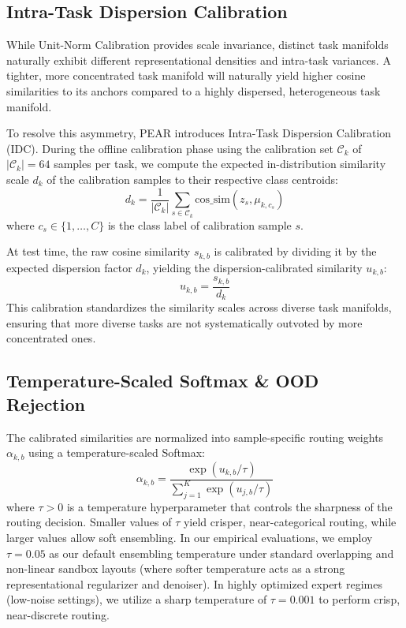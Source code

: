 \subsection{Intra-Task Dispersion Calibration}
While Unit-Norm Calibration provides scale invariance, distinct task manifolds naturally exhibit different representational densities and intra-task variances. A tighter, more concentrated task manifold will naturally yield higher cosine similarities to its anchors compared to a highly dispersed, heterogeneous task manifold. 

To resolve this asymmetry, PEAR introduces Intra-Task Dispersion Calibration (IDC). During the offline calibration phase using the calibration set $\mathcal{C}_k$ of $|\mathcal{C}_k| = 64$ samples per task, we compute the expected in-distribution similarity scale $d_k$ of the calibration samples to their respective class centroids:
\begin{equation}
    \label{eq:idc}
    d_k = \frac{1}{|\mathcal{C}_k|} \sum_{s \in \mathcal{C}_k} \text{cos\_sim}(z_s, \mu_{k, c_s})
\end{equation}
where $c_s \in \{1, \dots, C\}$ is the class label of calibration sample $s$.

At test time, the raw cosine similarity $s_{k, b}$ is calibrated by dividing it by the expected dispersion factor $d_k$, yielding the dispersion-calibrated similarity $u_{k, b}$:
\begin{equation}
    u_{k, b} = \frac{s_{k, b}}{d_k}
\end{equation}
This calibration standardizes the similarity scales across diverse task manifolds, ensuring that more diverse tasks are not systematically outvoted by more concentrated ones.

\subsection{Temperature-Scaled Softmax \& OOD Rejection}
The calibrated similarities are normalized into sample-specific routing weights $\alpha_{k, b}$ using a temperature-scaled Softmax:
\begin{equation}
    \alpha_{k, b} = \frac{\exp(u_{k, b} / \tau)}{\sum_{j=1}^K \exp(u_{j, b} / \tau)}
\end{equation}
where $\tau > 0$ is a temperature hyperparameter that controls the sharpness of the routing decision. Smaller values of $\tau$ yield crisper, near-categorical routing, while larger values allow soft ensembling. In our empirical evaluations, we employ $\tau = 0.05$ as our default ensembling temperature under standard overlapping and non-linear sandbox layouts (where softer temperature acts as a strong representational regularizer and denoiser). In highly optimized expert regimes (low-noise settings), we utilize a sharp temperature of $\tau = 0.001$ to perform crisp, near-discrete routing.

